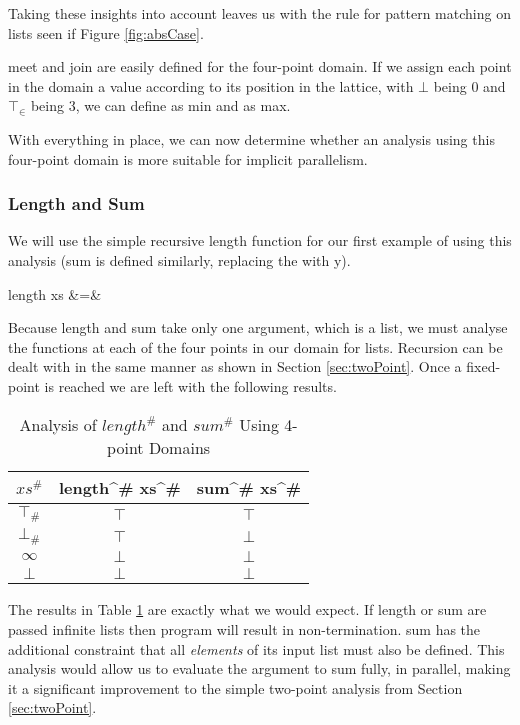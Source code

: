 Taking these insights into account leaves us with the rule for
pattern matching on lists seen if Figure \ref{fig:absCase}.

\<meet\> and \<join\> are easily defined for the four-point domain. If we
assign each point in the domain a value according to its position in the lattice,
with $\bot$ being $0$ and $\top_{\in}$ being $3$, we can define \meet as \<min\>
and \join as \<max\>.

With everything in place, we can now determine whether an analysis using this
four-point domain is more suitable for implicit parallelism.

\subsubsection{Length and Sum}

We will use the simple recursive \<length\> function for our first example of
using this analysis (\<sum\> is defined similarly, replacing the \> with
\<y\>).

\begin{haskell*}
length xs &=& 
\end{haskell*}

Because \<length\> and \<sum\> take only one argument, which is a list, we must
analyse the functions at each of the four points in our domain for lists.
Recursion can be dealt with in the same manner as shown in Section
\ref{sec:twoPoint}. Once a fixed-point is reached we are left with the
following results.

\begin{table}[h!]
\centering
\vspace{10pt}
\begin{tabular}{c || c c}
    $xs^{\#}$ & \<length^{\#} xs^{\#}\> & \<sum^{\#} xs^{\#}\> \\
    \hline
    $\top_{\#}$ & $\top$                & $\top$ \\
    $\bot_{\#}$ & $\top$                & $\bot$ \\
    $\infty$ & $\bot$                   & $\bot$ \\
    $\bot$ & $\bot$                     & $\bot$
\end{tabular}    
\caption{Analysis of \(length^{\#}\) and \(sum^{\#}\) Using 4-point Domains}
\label{tab:lengthSum}
\end{table}

The results in Table \ref{tab:lengthSum} are exactly what we would expect. If
\<length\> or \<sum\> are passed infinite lists then program will result in
non-termination. \<sum\> has the additional constraint that all \emph{elements}
of its input list must also be defined. This analysis would allow us to
evaluate the argument to \<sum\> fully, in parallel, making it a significant
improvement to the simple two-point analysis from Section \ref{sec:twoPoint}.

